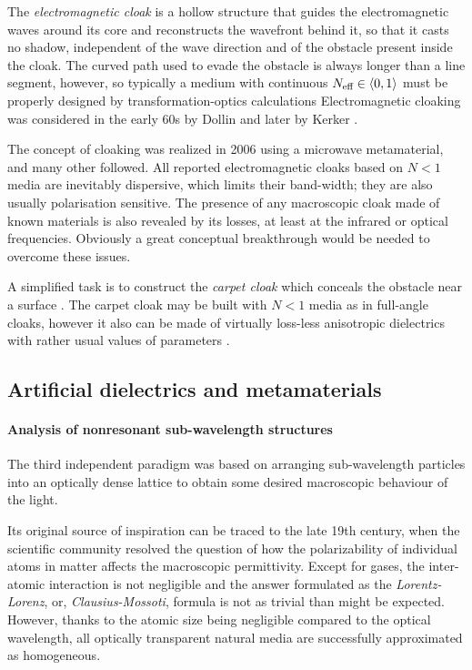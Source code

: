 The \textit{electromagnetic cloak} is a hollow structure that guides the electromagnetic waves around its core and reconstructs the wavefront behind it, so that it casts no shadow, independent of the wave direction and of the obstacle present inside the cloak. 
The curved path used to evade the obstacle is always longer than a line segment, however, so typically a medium with continuous $N_{\text{eff} }\in \langle0,1\rangle$ must be properly designed by transformation-optics calculations 
Electromagnetic cloaking %
was considered in the early 60s by Dollin \cite{dollin1961possibility} and later by Kerker \cite{kerker1975invisible}.

The concept of cloaking was realized \cite{schurig2006metamaterial} in 2006 using a microwave metamaterial, and many other followed.
All reported electromagnetic cloaks based on $N<1$ media are inevitably dispersive, which limits their band-width; they are also usually polarisation sensitive. The presence of any macroscopic cloak made of known materials is also revealed by its losses, at least at the infrared or optical frequencies. Obviously a great conceptual breakthrough would be needed to overcome these issues. 

A simplified task is to construct the \textit{carpet cloak} which conceals the obstacle near a surface \cite{valentine2009optical}.
The carpet cloak may be built with $N<1$ media as in full-angle cloaks, however it also can be made of virtually loss-less anisotropic dielectrics with rather usual values of parameters \cite{wang2013homogeneous}.


\subsection{Artificial dielectrics and metamaterials} 
\paragraph{Analysis of nonresonant sub-wavelength structures} %
The third independent paradigm was based on arranging sub-wavelength particles into an optically dense lattice to obtain some desired macroscopic behaviour of the light. 

Its original source of inspiration can be traced to the late 19th century, when the scientific community resolved the question of how the polarizability of individual atoms in matter affects the macroscopic permittivity. Except for gases, the inter-atomic interaction is not negligible and the answer formulated as the \textit{Lorentz-Lorenz}, or, \textit{Clausius-Mossoti}, formula is not as trivial than might be expected. However, thanks to the atomic size being negligible compared to the optical wavelength, all optically transparent natural media are successfully approximated as homogeneous. 

